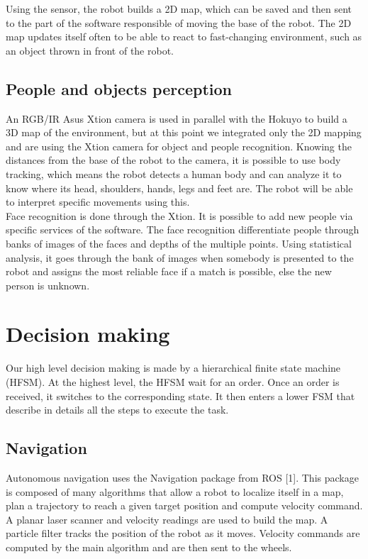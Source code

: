 \documentclass[runningheads,a4paper]{llncs}
\begin{document}
Using the sensor, the robot builds a 2D map, which can be saved and then sent to the part of the software responsible of moving the base of the robot. The 2D map updates itself often to be able to react to fast-changing environment, such as an object thrown in front of the robot.

\subsection{People and objects perception}
\tab An RGB/IR Asus Xtion camera is used in parallel with the Hokuyo to build a 3D map of the environment, but at this point we integrated only the 2D mapping and are using the Xtion camera for object and people recognition. Knowing the distances from the base of the robot to the camera, it is possible to use body tracking, which means the robot detects a human body and can analyze it to know where its head, shoulders, hands, legs and feet are. The robot will be able to interpret specific movements using this. \\

Face recognition is done through the Xtion. It is possible to add new people via specific services of the software. The face recognition differentiate people through banks of images of the faces and depths of the multiple points. Using statistical analysis, it goes through the bank of images when somebody is presented to the robot and assigns the most reliable face if a match is
possible, else the new person is unknown. 

\section{Decision making}
\tab Our high level decision making is made by a hierarchical finite state machine (HFSM). At the highest level, the HFSM wait for an order. Once an order is received, it switches to the corresponding state. It then enters a lower FSM that describe in details all the steps to execute the task. 

\subsection{Navigation}
\tab Autonomous navigation uses the Navigation package from ROS [1]. This package is composed of many algorithms that allow a robot to localize itself in a map, plan a trajectory to reach a given target position and compute velocity command. A planar laser scanner and velocity readings are used to build the map. A particle filter tracks the position of the robot as it moves. Velocity commands are computed by the main algorithm and are then sent to the wheels. 
\end{document}

